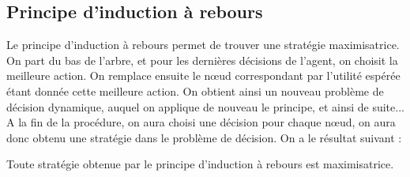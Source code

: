 \subsection{Principe d'induction à rebours}

Le principe d'induction à rebours permet de trouver une stratégie
maximisatrice. On part du bas de l'arbre, et pour les dernières
décisions de l'agent, on choisit la meilleure action. On remplace
ensuite le n{\oe}ud correspondant par l'utilité espérée étant
donnée cette meilleure action. On obtient ainsi un nouveau
problème de décision dynamique, auquel on applique de nouveau le
principe, et ainsi de suite... A la fin de la procédure, on aura
choisi une décision pour chaque n{\oe}ud, on aura donc obtenu une
stratégie dans le problème de décision. On a le résultat suivant :

\begin{proposition}
Toute stratégie obtenue par le principe d'induction à rebours est
maximisatrice.
\end{proposition}

